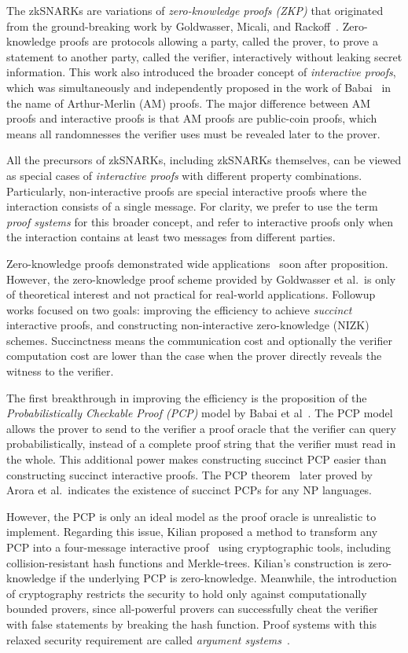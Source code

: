 \documentclass[acmtog]{acmart}
\begin{document}
The zkSNARKs are variations of \emph{zero-knowledge proofs (ZKP)} that originated from the ground-breaking work by Goldwasser, Micali, and Rackoff~\cite{GoldwasserMR85}.
Zero-knowledge proofs are protocols allowing a party, called the prover, to prove a statement to another party, called the verifier, interactively without leaking secret information.
This work also introduced the broader concept of \emph{interactive proofs}, which was simultaneously and independently proposed in the work of Babai~\cite{Babai85} in the name of Arthur-Merlin (AM) proofs.
The major difference between AM proofs and interactive proofs is that AM proofs are public-coin proofs, which means all randomnesses the verifier uses must be revealed later to the prover.

All the precursors of zkSNARKs, including zkSNARKs themselves, can be viewed as special cases of \emph{interactive proofs} with different property combinations.
Particularly, non-interactive proofs are special interactive proofs where the interaction consists of a single message.
For clarity, we prefer to use the term \emph{proof systems} for this broader concept, and refer to interactive proofs only when the interaction contains at least two messages from different parties.

Zero-knowledge proofs demonstrated wide applications~\cite{GoldreichMW86, GoldreichMW87} soon after proposition.
However, the zero-knowledge proof scheme provided by Goldwasser et al.\ is only of theoretical interest and not practical for real-world applications.
Followup works focused on two goals: improving the efficiency to achieve \emph{succinct} interactive proofs, and constructing non-interactive zero-knowledge (NIZK) schemes.
Succinctness means the communication cost and optionally the verifier computation cost are lower than the case when the prover directly reveals the witness to the verifier.

The first breakthrough in improving the efficiency is the proposition of the \emph{Probabilistically Checkable Proof (PCP)} model by Babai et al~\cite{BabaiFLS91}.
The PCP model allows the prover to send to the verifier a proof oracle that the verifier can query probabilistically, instead of a complete proof string that the verifier must read in the whole.
This additional power makes constructing succinct PCP easier than constructing succinct interactive proofs.
The PCP theorem~\cite{AroraLMSS98} later proved by Arora et al.\ indicates the existence of succinct PCPs for any NP languages.

However, the PCP is only an ideal model as the proof oracle is unrealistic to implement.
Regarding this issue, Kilian proposed a method to transform any PCP into a four-message interactive proof~\cite{Kilian92} using cryptographic tools, including collision-resistant hash functions and Merkle-trees.
Kilian's construction is zero-knowledge if the underlying PCP is zero-knowledge.
Meanwhile, the introduction of cryptography restricts the security to hold only against computationally bounded provers, since all-powerful provers can successfully cheat the verifier with false statements by breaking the hash function.
Proof systems with this relaxed security requirement are called \emph{argument systems}~\cite{BrassardCC88}.
\end{document}
